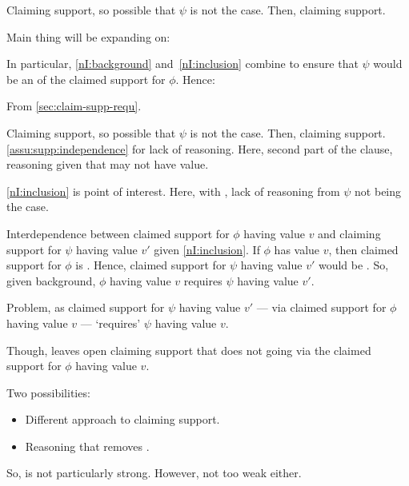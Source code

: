 \begin{note}
  Claiming support, so possible that \(\psi\) is not the case.
  Then, claiming support.

  Main thing will be expanding on:

  \begin{quote}
    \vspace{-\baselineskip}
    \ideaEIS*
  \end{quote}

  In particular, \ref{nI:background} and~\ref{nI:inclusion} combine to ensure that \(\psi\) would be an \requ{} of the claimed support for \(\phi\).
  Hence:

  \begin{quote}
    \vspace{-\baselineskip}
    \assuCSRReq*
  \end{quote}

  From \autoref{sec:claim-supp-requ}.

  Claiming support, so possible that \(\psi\) is not the case.
  Then, claiming support.
  \autoref{assu:supp:independence} for lack of reasoning.
  Here, second part of the clause, reasoning given that \requ{} may not have value.

  \ref{nI:inclusion} is point of interest.
  Here, with \nI{}, lack of reasoning from \(\psi\) not being the case.
\end{note}


\begin{note}
  Interdependence between claimed support for \(\phi\) having value \(v\) and claiming support for \(\psi\) having value \(v'\) given \ref{nI:inclusion}.
  If \(\phi\) has value \(v\), then claimed support for \(\phi\) is \nmom{}.
  Hence, claimed support for \(\psi\) having value \(v'\) would be \nmom{}.
  So, given background, \(\phi\) having value \(v\) requires \(\psi\) having value \(v'\).

  Problem, as claimed support for \(\psi\) having value \(v'\) --- via claimed support for \(\phi\) having value \(v\) --- `requires' \(\psi\) having value \(v\).

  Though, leaves open claiming support that does not going via the claimed support for \(\phi\) having value \(v\).

  Two possibilities:
  \begin{itemize}
  \item Different approach to claiming support.
  \item Reasoning that removes \requ{}.
  \end{itemize}

  So, \nI{} is not particularly strong.
  However, not too weak either.
\end{note}



